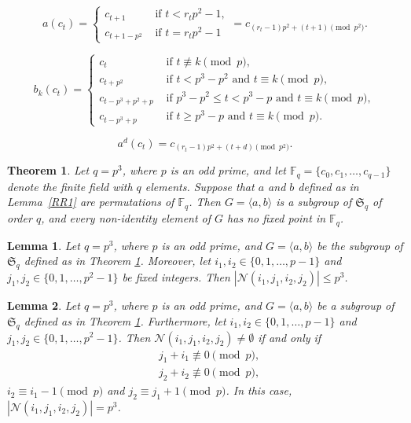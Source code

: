 \documentclass[10pt,a4paper]{amsart}
\newtheorem{lem}{Lemma}
\newtheorem{thm}{Theorem}
\def\F{{\mathbb F}}
\begin{document}
 \begin{equation}\label{e21}
a(c_{t})=\begin{cases}

       c_{t+1} & \text{ if } t < r_tp^{2}-1, \\
       c_{t+1-p^2} & \text{ if } t=r_tp^{2}-1
       	\end{cases}
=c_{(r_t-1)p^{2}+(t+1)\pmod {p^{2}}}.
\end{equation}

\begin{equation}\label{e22}
b_k(c_{t})=\begin{cases}
       c_{t} & \text{ if } t \not \equiv k  \pmod  p, \\
       c_{t+p^2} & \text{ if } t < p^{3}-p^2 \text{ and } t \equiv k  \pmod  p, \\
       c_{t-p^3+p^2+p} & \text{ if } p^{3}-p^2 \leq  t < p^{3}-p \text{ and } t \equiv k  \pmod  p,\\
       c_{t-p^3+p} & \text{ if }    t \geq p^{3}-p \text{ and } t \equiv k \pmod  p.
       	\end{cases}
\end{equation}

\begin{equation}\label{tempe4}
a^{d}(c_t)=c_{(r_t-1)p^2+(t+d) \pmod {p^2}}.
\end{equation}

\begin{thm}\label{T31}
Let $q=p^3$, where $p$ is an odd prime, and let $\F_q=\{c_0,c_1,\ldots,c_{q-1}\}$ denote the finite field with $q$ elements. Suppose that $a$ and $b$ defined as in Lemma~\ref{RR1} are permutations of $\F_q$. Then $G=\langle a,b\rangle$ is a subgroup of $\mathfrak{S}_q$ of order $q$, and every non-identity element of $G$ has no fixed point in $\F_q$.
\end{thm}

\begin{lem}\label{Atmost_lemma_T31}
Let $q=p^3$, where $p$ is an odd prime, and $G=\langle a,b \rangle $ be the subgroup of $\mathfrak{S}_q$ defined as in Theorem \ref{T31}. Moreover, let $i_1,i_2 \in  \{0,1,\ldots,p-1\}$ and $j_1,j_2 \in \{0,1,\ldots,p^{2}-1\}$ be fixed integers. Then $|\mathcal{N}(i_1,j_1,i_2,j_2)| \leq  p^3$.
\end{lem}

\begin{lem}\label{Atleast_lemma_T31}
Let $q=p^3$, where $p$ is an odd prime, and $G=\langle a,b \rangle$ be a subgroup of $\mathfrak{S}_q$ defined as in Theorem \ref{T31}. Furthermore,  let $i_1,i_2 \in \{0,1,\ldots,p-1\}$ and $j_1,j_2 \in \{0,1,\ldots,p^{2}-1\}$. Then $\mathcal{N}(i_1,j_1,i_2,j_2) \neq \emptyset$ if and only if 
\begin{equation*}
\begin{split}
& j_1+i_1 \not \equiv  0  \pmod  p,\\& 
  j_2+i_2 \not \equiv  0 \pmod  p,
\end{split}
\end{equation*}
 $i_2\equiv i_1-1 \pmod  p$ and $j_2 \equiv j_1+1 \pmod  p$. In this case,  $|\mathcal{N}(i_1,j_1,i_2,j_2)|=p^3$.
\end{lem}
\end{document}
